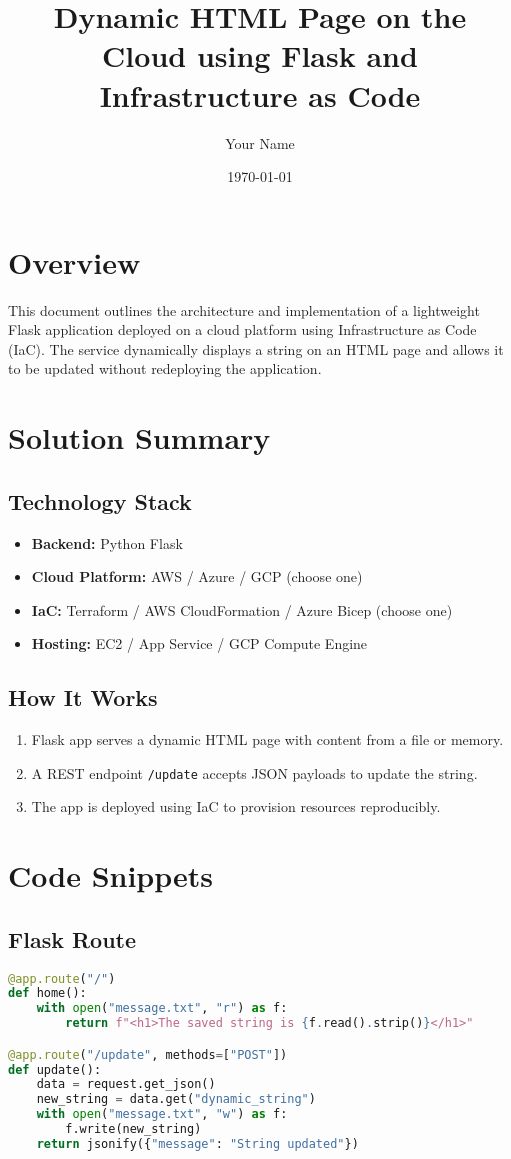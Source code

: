 \documentclass[12pt]{article}
\title{Dynamic HTML Page on the Cloud using Flask and Infrastructure as Code}
\author{Your Name}
\date{\today}
\begin{document}
\maketitle

\section{Overview}
This document outlines the architecture and implementation of a lightweight Flask application deployed on a cloud platform using Infrastructure as Code (IaC). The service dynamically displays a string on an HTML page and allows it to be updated without redeploying the application.

\section{Solution Summary}
\subsection*{Technology Stack}
\begin{itemize}
    \item \textbf{Backend:} Python Flask
    \item \textbf{Cloud Platform:} AWS / Azure / GCP (choose one)
    \item \textbf{IaC:} Terraform / AWS CloudFormation / Azure Bicep (choose one)
    \item \textbf{Hosting:} EC2 / App Service / GCP Compute Engine
\end{itemize}

\subsection*{How It Works}
\begin{enumerate}
    \item Flask app serves a dynamic HTML page with content from a file or memory.
    \item A REST endpoint \texttt{/update} accepts JSON payloads to update the string.
    \item The app is deployed using IaC to provision resources reproducibly.
\end{enumerate}

\section{Code Snippets}
\subsection*{Flask Route}
\begin{lstlisting}[language=Python]
@app.route("/")
def home():
    with open("message.txt", "r") as f:
        return f"<h1>The saved string is {f.read().strip()}</h1>"

@app.route("/update", methods=["POST"])
def update():
    data = request.get_json()
    new_string = data.get("dynamic_string")
    with open("message.txt", "w") as f:
        f.write(new_string)
    return jsonify({"message": "String updated"})
\end{lstlisting}
\end{document}
